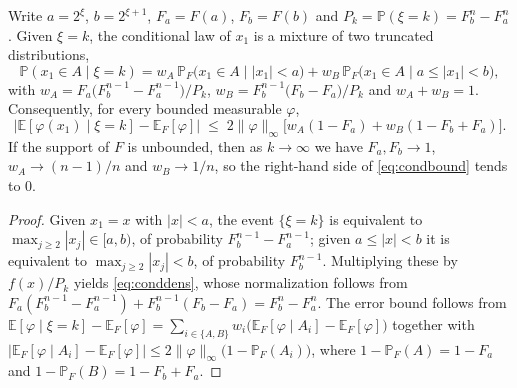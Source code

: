 \documentclass[review,hidelinks,oneeqnum,onetabnum,onefignum,onethmnum]{siamart251216}
\begin{document}
\begin{lemma}
\label{lem:cond}
Write $a=2^{\xi}$, $b=2^{\xi+1}$, $F_a=F(a)$, $F_b=F(b)$ and
$P_k=\mathbb P(\xi=k)=F_b^n-F_a^n$. Given $\xi=k$, the conditional law of $x_1$ is
a mixture of two truncated distributions,
\begin{equation}
\mathbb P(x_1\in A\mid\xi=k)
=w_A\,\mathbb P_F\bigl(x_1\in A\mid |x_1|<a\bigr)
+w_B\,\mathbb P_F\bigl(x_1\in A\mid a\le|x_1|<b\bigr),
\label{eq:conddens}
\end{equation}
with
$w_A=F_a\bigl(F_b^{n-1}-F_a^{n-1}\bigr)/P_k$,
$w_B=F_b^{n-1}\bigl(F_b-F_a\bigr)/P_k$ and $w_A+w_B=1$. Consequently, for every
bounded measurable $\varphi$,
\begin{equation}
\bigl|\mathbb E[\varphi(x_1)\mid\xi=k]-\mathbb E_F[\varphi]\bigr|
\;\le\;2\|\varphi\|_\infty\bigl[w_A(1-F_a)+w_B(1-F_b+F_a)\bigr].
\label{eq:condbound}
\end{equation}
If the support of $F$ is unbounded, then as $k\to\infty$ we have $F_a,F_b\to1$,
$w_A\to(n-1)/n$ and $w_B\to1/n$, so the right-hand side of \cref{eq:condbound}
tends to $0$.
\end{lemma}

\begin{proof}
Given $x_1=x$ with $|x|<a$, the event $\{\xi=k\}$ is equivalent to
$\max_{j\ge2}|x_j|\in[a,b)$, of probability $F_b^{n-1}-F_a^{n-1}$; given
$a\le|x|<b$ it is equivalent to $\max_{j\ge2}|x_j|<b$, of probability
$F_b^{n-1}$. Multiplying these by $f(x)/P_k$ yields \cref{eq:conddens}, whose
normalization follows from
$F_a(F_b^{n-1}-F_a^{n-1})+F_b^{n-1}(F_b-F_a)=F_b^n-F_a^n$. The error bound follows
from
$\mathbb E[\varphi\mid\xi=k]-\mathbb E_F[\varphi]=\sum_{i\in\{A,B\}}w_i\bigl(\mathbb E_F[\varphi\mid A_i]-\mathbb E_F[\varphi]\bigr)$
together with
$|\mathbb E_F[\varphi\mid A_i]-\mathbb E_F[\varphi]|\le2\|\varphi\|_\infty\bigl(1-\mathbb P_F(A_i)\bigr)$,
where $1-\mathbb P_F(A)=1-F_a$ and $1-\mathbb P_F(B)=1-F_b+F_a$.
\end{proof}
\end{document}
